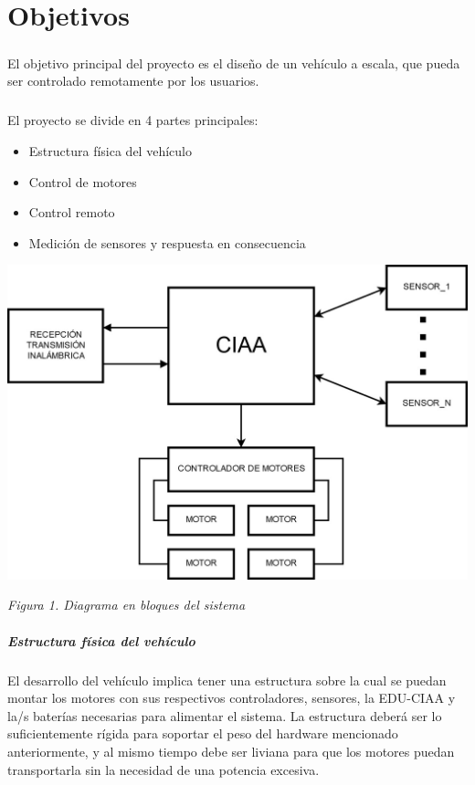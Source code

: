 \chapter{Objetivos}

\paragraph{}
El objetivo principal del proyecto es el diseño de un vehículo a escala, que pueda ser controlado remotamente por los usuarios.

\paragraph{}
El proyecto se divide en 4 partes principales:

\begin{itemize}
	\item Estructura física del vehículo
	\item Control de motores
	\item Control remoto
	\item Medición de sensores y respuesta en consecuencia
\end{itemize}

\includegraphics[width=1\linewidth]{informe_1/diagrama_bloque}
{
	\centering\textit{Figura 1. Diagrama en bloques del sistema}

}

\paragraph{Estructura física del vehículo}
El desarrollo del vehículo implica tener una estructura sobre la cual se puedan montar los motores con sus respectivos controladores, sensores, la EDU-CIAA y la/s baterías necesarias para alimentar el sistema. La estructura deberá ser lo suficientemente rígida para soportar el peso del hardware mencionado anteriormente, y al mismo tiempo debe ser liviana para que los motores puedan transportarla sin la necesidad de una potencia excesiva.

